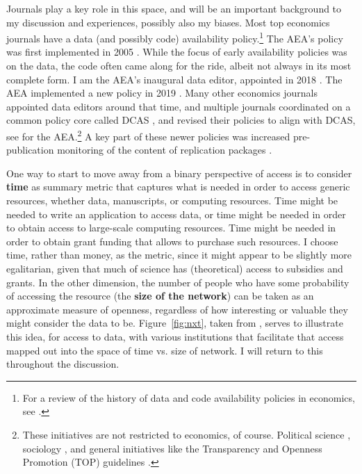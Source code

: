 \documentclass{Revue-economique}
\newcommand{\citep}{\parencite}
\newcommand{\citet}{\textcite}
\begin{document}
\begin{Article} [%
	Titre={Reproducibility and Open Science in Economics},
	Auteur={Lars Vilhuber\thanks{Cornell University, lars.vilhuber@cornell.edu}}]
\begin{refsection}[Main]
Journals play a key role in this space, and will be an important background to my discussion and experiences, possibly also my biases. Most top economics journals have a data (and possibly code) availability policy.\footnote{For a review of the history of data and code availability policies in economics, see \citet{vlaeminck_dawning_2021}.} The AEA's policy was first implemented in 2005 \citep{bernanke_editorial_2004,american_economic_association_data_2005}. While the focus of early availability policies was on the data, the code often came along for the ride, albeit not always in its most complete form. I am the \ac{AEA}'s inaugural data editor, appointed in 2018 \citep{10.1257/pandp.108.745}. The AEA implemented a new policy in 2019 \citep{AEA-announcement-July-2019,AEA-announcement-July-2019}. Many other economics journals appointed data editors around that time, and  multiple journals coordinated on a common policy core called  \ac{DCAS} \citep{koren_data_2022}, and revised their policies to align with \ac{DCAS}, see \citet{american_economic_association_data_2024} for the AEA.\footnote{These initiatives are not restricted to economics, of course. Political science \citep{noauthor_data_2014,jacoby_american_2015,basile_research_2023}, sociology \citep{sociological_science_manuscript_2018,weeden_crisis_2023}, and general initiatives like the Transparency and Openness Promotion (TOP) guidelines \citep{nosek_promoting_2015}.} A key part of these newer policies was increased pre-publication monitoring of the content of replication packages \citep{10.1257/pandp.108.745,ChristianInt.J.Digit.Curation2018}.


One way to start to move away from a binary perspective of access is to consider \textbf{time} as summary metric that captures what is needed in order to access generic resources, whether data, manuscripts, or computing resources. Time might be needed to write an application to access data, or time might be needed in order to obtain access to large-scale computing resources. Time might be needed in order to obtain grant funding that allows to purchase such resources. I choose time, rather than money, as the metric, since it might appear to be slightly more egalitarian, given that much of science has (theoretical) access to subsidies and grants. In the other dimension,  the number of people who have some probability of accessing the resource (the \textbf{size of the network}) can be taken as an approximate measure of openness, regardless of how interesting or valuable they might consider the data to be. Figure~\ref{fig:nxt}, taken from \citet{vilhuber_reproducibility_2023}, serves to illustrate this idea, for access to data, with various institutions that facilitate that access mapped out into the space of time vs. size of network. I will return to this throughout the discussion.


\end{refsection}
\end{Article}
\end{document}
